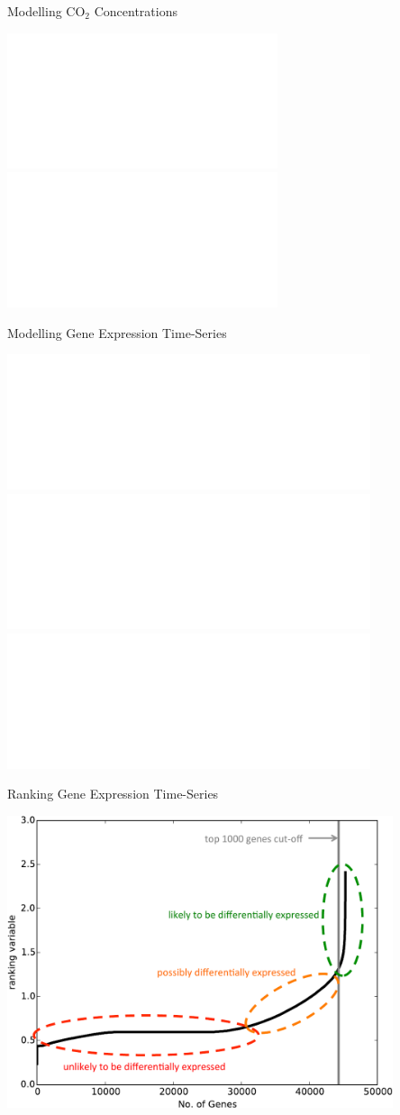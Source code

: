 \documentclass[pdf]{beamer}
\begin{document}
\begin{frame}{Modelling CO$_2$ Concentrations}
\begin{center}
	\includegraphics<1>[width=\textwidth]{CO2RawTake2.pdf}
	\includegraphics<2>[width=\textwidth]{CO2GPFit.pdf}
\end{center}
\end{frame}

\begin{frame}{Modelling Gene Expression Time-Series}
\begin{center}
	\includegraphics<1>[width=0.8\textwidth]{ProbeRaw.pdf}
	\includegraphics<2>[width=0.8\textwidth]{ProbeGP.pdf}
	\includegraphics<3>[width=0.8\textwidth]{ProbeGPAnnotate.pdf}
\end{center}
\end{frame}

\begin{frame}{Ranking Gene Expression Time-Series}
\begin{center}
	\includegraphics[width=0.85\textwidth]{ProbeRanking.pdf}
\end{center}
\end{frame}
\end{document}
